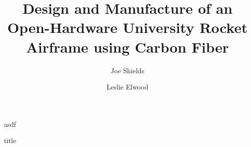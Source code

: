 \documentclass[landscape,a0paper,fontscale=0.285]{baposter} %
\title{Design and Manufacture of an Open-Hardware University Rocket Airframe using Carbon Fiber}
\author{Joe Shields \and Leslie Elwood }
\begin{document}
asdf
\begin{frame}
\lipsum
\end{frame}

\begin{block}{title}
	\lipsum
\end{block}
\end{document}
